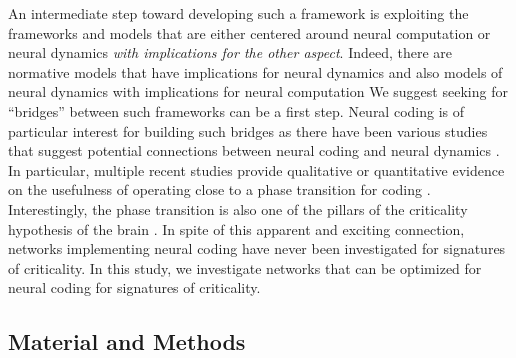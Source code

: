An intermediate step toward developing such a framework is exploiting the frameworks and models that are either centered around neural computation or neural dynamics \emph{with implications for the other aspect}.
Indeed, there are normative models that have implications for neural dynamics
\cite{lengyelMatchingStorageRecall2005,deneveBayesianSpikingNeurons2008a,deneveBayesianSpikingNeurons2008,tanakaRecurrentInfomaxGenerates2008,buesingNeuralDynamicsSampling2011,boerlinPredictiveCodingDynamical2013,billDistributedBayesianComputation2015,chalkNeuralOscillationsSignature2016,zeldenrustEfficientRobustCoding2019,echevesteCorticallikeDynamicsRecurrent2020}
and also models of neural dynamics with implications for neural computation
\cite{bertschingerRealtimeComputationEdge2004,eliasmithUnifiedApproachBuilding2005,sussilloNeuralCircuitsComputational2014,hidalgoInformationbasedFitnessEmergence2014a,shrikiOptimalInformationRepresentation2016,maassSearchingPrinciplesBrain2016,kimLearningRecurrentDynamics2018,chenComputingModulatingSpontaneous2019,michielsvankessenichPatternRecognitionNeuronal2019,finlinsonOptimalControlExcitable2020}
We suggest seeking for ``bridges'' between such frameworks can be a first step.
%
Neural coding is of particular interest for building such bridges
as there have been various studies that suggest potential connections between neural coding and neural dynamics 
\cite{ermentroutRelatingNeuralDynamics2007c,boerlinPredictiveCodingDynamical2013,shrikiOptimalInformationRepresentation2016,chalkNeuralOscillationsSignature2016,alamiaAlphaOscillationsTraveling2019,kadmonPredictiveCodingBalanced2020,roethEfficientPopulationCoding2020,echevesteCorticallikeDynamicsRecurrent2020}.
In particular, multiple recent studies provide qualitative or quantitative evidence on the usefulness of operating close to a phase transition for coding
\cite{shrikiOptimalInformationRepresentation2016,chalkNeuralOscillationsSignature2016,kadmonPredictiveCodingBalanced2020,roethEfficientPopulationCoding2020}.
Interestingly, the phase transition is also one of the pillars of the criticality hypothesis of the brain
\cite{munozColloquiumCriticalityDynamical2018,tkacikInformationProcessingLiving2016,moraAreBiologicalSystems2011a}.
In spite of this apparent and exciting connection,
networks implementing neural coding have never been investigated for signatures of criticality.
In this study, we investigate networks that can be optimized for neural coding for signatures of criticality.

\subsection*{Material and Methods}

